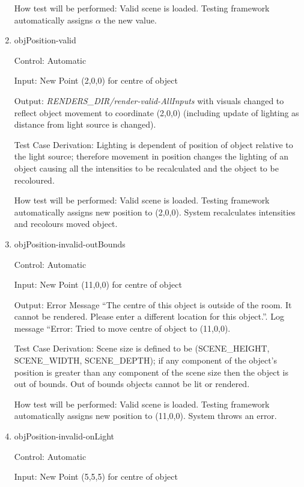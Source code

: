 \documentclass[12pt, titlepage]{article}
\begin{document}
\begin{enumerate}
	How test will be performed: Valid scene is loaded. Testing framework 
	automatically assigns $\alpha$ the new value.

	\item{objPosition-valid\\}
	
	Control: Automatic
	
	Input: New Point (2,0,0) for centre of object
	
	Output: \textit{RENDERS\_DIR/render-valid-AllInputs} with visuals changed 
	to reflect object movement to coordinate (2,0,0) (including update of 
	lighting as distance from light source is changed).
	
	Test Case Derivation: Lighting is dependent of position of object relative 
	to the light source; therefore movement in position changes the lighting of 
	an object causing all the intensities to be recalculated and the object to 
	be recoloured.

	How test will be performed: Valid scene is loaded. Testing framework 
	automatically assigns new position to (2,0,0). System recalculates 
	intensities and recolours moved object.
	
	\item{objPosition-invalid-outBounds\\}
	
	Control: Automatic
	
	Input: New Point (11,0,0) for centre of object
	
	Output: Error Message ``The centre of this object is outside of the room. 
	It cannot be rendered. Please enter a different location for this 
	object.''. Log message ``Error: Tried to move centre of object to (11,0,0).
	
	Test Case Derivation: Scene size is defined to be (SCENE\_HEIGHT, 
	SCENE\_WIDTH, SCENE\_DEPTH); if any component of the object's position is 
	greater than any component of the scene size then the object is out of 
	bounds. Out of bounds objects cannot be lit or rendered.
	
	How test will be performed: Valid scene is loaded. Testing framework 
	automatically assigns new position to (11,0,0). System throws an error.
	
	\item{objPosition-invalid-onLight\\}
	
	Control: Automatic
	
	Input: New Point (5,5,5) for centre of object
	

\end{enumerate}
\end{document}
